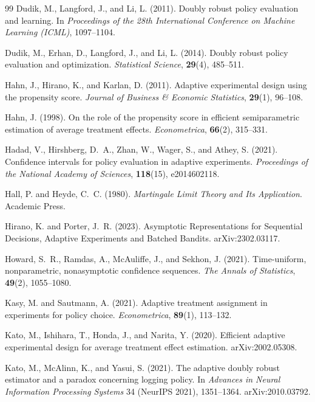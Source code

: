 \documentclass[11pt]{article}
\numberwithin{equation}{section}
\theoremstyle{plain}
\theoremstyle{definition}
\theoremstyle{remark}
\newcommand{\arxiv}[1]{arXiv:#1}
\begin{document}
\begin{thebibliography}{99}
Dudik, M., Langford, J., and Li, L. (2011).
Doubly robust policy evaluation and learning.
In \emph{Proceedings of the 28th International Conference on Machine Learning (ICML)}, 1097--1104.

Dudik, M., Erhan, D., Langford, J., and Li, L. (2014).
Doubly robust policy evaluation and optimization.
\emph{Statistical Science}, \textbf{29}(4), 485--511.

Hahn, J., Hirano, K., and Karlan, D. (2011).
Adaptive experimental design using the propensity score.
\emph{Journal of Business \& Economic Statistics}, \textbf{29}(1), 96--108.

Hahn, J. (1998).
On the role of the propensity score in efficient semiparametric estimation of average treatment effects.
\emph{Econometrica}, \textbf{66}(2), 315--331.

Hadad, V., Hirshberg, D.~A., Zhan, W., Wager, S., and Athey, S. (2021).
Confidence intervals for policy evaluation in adaptive experiments.
\emph{Proceedings of the National Academy of Sciences}, \textbf{118}(15), e2014602118.

Hall, P. and Heyde, C.~C. (1980).
\emph{Martingale Limit Theory and Its Application}.
Academic Press.

Hirano, K. and Porter, J.~R. (2023).
Asymptotic Representations for Sequential Decisions, Adaptive Experiments and Batched Bandits.
\arxiv{2302.03117}.

Howard, S.~R., Ramdas, A., McAuliffe, J., and Sekhon, J. (2021).
Time-uniform, nonparametric, nonasymptotic confidence sequences.
\emph{The Annals of Statistics}, \textbf{49}(2), 1055--1080.

Kasy, M. and Sautmann, A. (2021).
Adaptive treatment assignment in experiments for policy choice.
\emph{Econometrica}, \textbf{89}(1), 113--132.

Kato, M., Ishihara, T., Honda, J., and Narita, Y. (2020).
Efficient adaptive experimental design for average treatment effect estimation.
\arxiv{2002.05308}.

Kato, M., McAlinn, K., and Yasui, S. (2021).
The adaptive doubly robust estimator and a paradox concerning logging policy.
In \emph{Advances in Neural Information Processing Systems} 34 (NeurIPS 2021), 1351--1364. \arxiv{2010.03792}.


\end{thebibliography}
\end{document}
